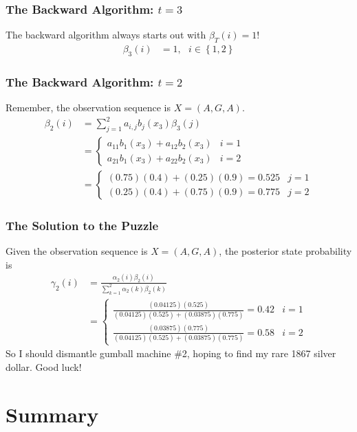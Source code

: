 \documentclass{beamer}
\begin{document}
\begin{frame}
  \frametitle{The Backward Algorithm: $t=3$}

  The backward algorithm always starts out with $\beta_T(i)=1$! 
  \begin{align*}
  \beta_3(i) &= 1,~~~i\in\left\{1,2\right\}
  \end{align*}
  
\end{frame}

\begin{frame}
  \frametitle{The Backward Algorithm: $t=2$}

  Remember, the observation sequence is $X=(A,G,A)$.
  \begin{align*}
  \beta_2(i) &= \sum_{j=1}^2 a_{i,j}b_j(x_3)\beta_3(j)\\
  &= \begin{cases}
    a_{11}b_1(x_3)+a_{12}b_2(x_3) & i=1\\
    a_{21}b_1(x_3)+a_{22}b_2(x_3) & i=2
  \end{cases}\\
  &= \begin{cases}
    (0.75)(0.4)+(0.25)(0.9)=0.525 & j=1\\
    (0.25)(0.4)+(0.75)(0.9)=0.775 & j=2
  \end{cases}
  \end{align*}  
\end{frame}

\begin{frame}
  \frametitle{The Solution to the Puzzle}

  Given the observation sequence is $X=(A,G,A)$, 
  the posterior state probability is
  \begin{align*}
    \gamma_2(i)&=\frac{\alpha_2(i)\beta_2(i)}{\sum_{k=1}^2\alpha_2(k)\beta_2(k)}\\
    &= \begin{cases}
      \frac{(0.04125)(0.525)}{(0.04125)(0.525)+(0.03875)(0.775)}
      = 0.42 & i=1\\
      \frac{(0.03875)(0.775)}{(0.04125)(0.525)+(0.03875)(0.775)}
      = 0.58 & i=2
    \end{cases}
  \end{align*}
  So I should dismantle gumball machine \#2, hoping to find my rare
  1867 silver dollar.  Good luck!
\end{frame}

\section[Summary]{Summary}
\setcounter{subsection}{1}
\end{document}
